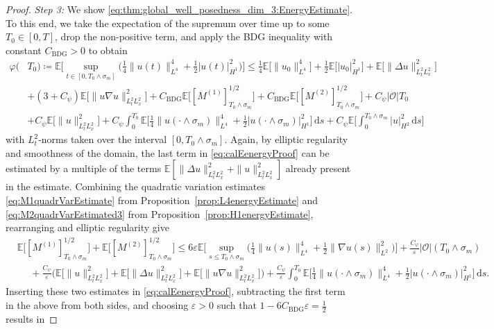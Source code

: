 \documentclass[reqno]{amsart}
\newcommand{\E}{\mathbb{E}}
\newcommand{\sO}{\mathscr{O}}
\newcommand{\ce}{\coloneqq}
\newcommand{\1}{\mathbf{1}}
\newcommand{\grad}{\nabla}
\newcommand{\ds}{\,\mathrm{d}s}
\newcommand{\CBDG}{C_{\mathrm{BDG}}}
\begin{document}
\begin{proof}
    \textit{Step 3:} We show \eqref{eq:thm:global_well_posedness_dim_3:EnergyEstimate}. To this end, we take the expectation of the supremum over time up to some $T_0\in[0,T]$, drop the non-positive term, and apply the BDG inequality with constant $\CBDG>0$ to obtain
    \begin{align}
    \label{eq:calEenergyProof}
     \varphi(&T_0)\ce \E\bigg[\sup_{t\in[0,T_0\wedge \sigma_m]}  \Big(\frac{1}{4}\|u(t)\|_{L^4}^4 +\frac{1}{2}|u(t)|^2_{H^1}\Big) \bigg] \le \frac{1}{4} \E\big[\|u_0\|^{4}_{L^4}\big] + \frac{1}{2}\E\big[|u_0|^2_{H^1}\big]+ \E\big[\|\Delta u\|_{L_t^2L_x^2}^2\big]\nonumber\\
          &+ (3+C_\psi)\E\big[\|u\grad u\|_{L_t^2L_x^2}^2\big]+ \CBDG\E\big[[M^{(1)}]^{1/2}_{T_0\wedge \sigma_m}\big]  + \CBDG\E\big[[M^{(2)}]^{1/2}_{T_0\wedge \sigma_m}\big] +C_\psi|\sO|T_0\nonumber\\
          &+ C_\psi \E\big[\|u\|_{L_t^2L_x^2}^2\big]+ C_\psi \int_0^{T_0} \E\Big[\frac{1}{4}\|u(\cdot\land\sigma_m)\|_{L^4}^4+\frac{1}{2}|u(\cdot\land\sigma_m)|_{H^1}^2\Big]  \ds  + C_\psi \E\Big[\int_0^{T_0\land\sigma_m}  |u|_{H^2}^2 \ds\Big]
    \end{align}
    with $L_t^2$-norms taken over the interval $[0,T_0\land \sigma_m]$.  Again, by elliptic regularity and smoothness of the domain, the last term in \eqref{eq:calEenergyProof} can be estimated by a multiple of the terms $\E[\|\Delta u\|_{L_t^2L_x^2}^2+\|u\|_{L_t^2L_x^2}^2]$ already present in the estimate.
    Combining the quadratic variation estimates \eqref{eq:M1quadrVarEstimate} from Proposition~\ref{prop:L4energyEstimate} and \eqref{eq:M2quadrVarEstimated3} from Proposition~\ref{prop:H1energyEstimate}, rearranging and elliptic regularity give
    \begin{align*}
        &\E\big[[M^{(1)}]_{T_0\wedge \sigma_m}^{1/2}\big]+\E\big[ [M^{(2)}]^{1/2}_{T_0\wedge \sigma_m}\big] 
        \le 6\varepsilon \E\bigg[\sup_{s\leq {T_0\wedge \sigma_m}}  \Big(\frac{1}{4}\|u(s)\|_{L^4}^4+\frac{1}{2}\|\grad u(s)\|^2_{L^2}\Big) \bigg] + \frac{C_\psi}{\varepsilon}|\sO|(T_0\land\sigma_m)\\
        &\phantom{\le} + \frac{C_\psi}{\varepsilon}\big(\E\big[\|u\|_{L_t^2L_x^2}^2\big]+ \E\big[\|\Delta u\|_{L_t^2L_x^2}^2\big]+ \E\big[\|u\grad u\|_{L_t^2L_x^2}^2\big]\big)+ \frac{C_\psi}{\varepsilon}\int_0^{T_0} \E\Big[\frac{1}{4}\|u(\cdot\land\sigma_m)\|_{L^4}^4+\frac{1}{2}|u(\cdot\land\sigma_m)|_{H^1}^2\Big]\ds.
    \end{align*}
    Inserting these two estimates in \eqref{eq:calEenergyProof}, subtracting the first term in the above from both sides, and choosing $\varepsilon>0$ such that $1-6\CBDG\varepsilon=\frac{1}{2}$ results in

\end{proof}
\end{document}
